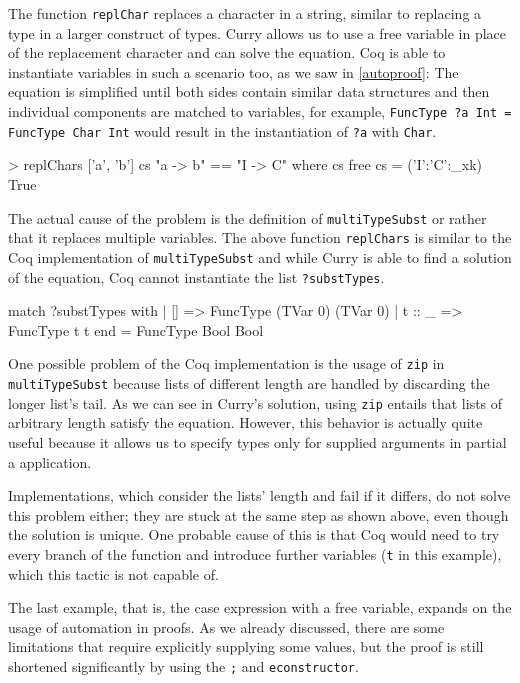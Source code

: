 \documentclass[paper = a4, fleqn, twoside]{scrreprt}
\begin{document}
The function \texttt{replChar} replaces a character in a string, similar to replacing a type in a larger construct of types. Curry allows us to use a free variable in place of the replacement character and can solve the equation. Coq is able to instantiate variables in such a scenario too, as we saw in \autoref{autoproof}: The equation is simplified until both sides contain similar data structures and then individual components are matched to variables, for example, \texttt{FuncType ?a Int = FuncType Char Int} would result in the instantiation of \texttt{?a} with \texttt{Char}.
\begin{coqcode}
> replChars ['a', 'b'] cs "a -> b" == "I -> C" where cs free
{cs = ('I':'C':_xk)} True
\end{coqcode}
The actual cause of the problem is the definition of \texttt{multiTypeSubst} or rather that it replaces multiple variables. The above function \texttt{replChars} is similar to the Coq implementation of \texttt{multiTypeSubst} and while Curry is able to find a solution of the equation, Coq cannot instantiate the list \texttt{?substTypes}.
\begin{coqcode}
match ?substTypes with
| [] => FuncType (TVar 0) (TVar 0)
| t :: _ => FuncType t t
end = FuncType Bool Bool
\end{coqcode}
One possible problem of the Coq implementation is the usage of \texttt{zip} in \texttt{multiTypeSubst} because lists of different length are handled by discarding the longer list's tail. As we can see in Curry's solution, using \texttt{zip} entails that lists of arbitrary length satisfy the equation. However, this behavior is actually quite useful because it allows us to specify types only for supplied arguments in partial a application.
\par \noindent
Implementations, which consider the lists' length and fail if it differs, do not solve this problem either; they are stuck at the same step  as shown above, even though the solution is unique. One probable cause of this is that Coq would need to try every branch of the function and introduce further variables (\texttt{t} in this example), which this tactic is not capable of.\\
\par \noindent
The last example, that is, the case expression with a free variable, expands on the usage of automation in proofs. As we already discussed, there are some limitations that require explicitly supplying some values, but the proof is still shortened significantly by using the \texttt{;} and \texttt{econstructor}.
\end{document}
